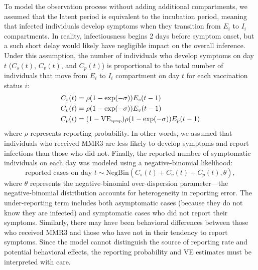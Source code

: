 \documentclass[12pt]{article}
\begin{document}
To model the observation process without adding additional compartments, we assumed that the latent period is equivalent to the incubation period, meaning that infected individuals develop symptoms when they transition from $E_i$ to $I_i$ compartments.
In reality, infectiousness begins 2 days before symptom onset, but a such short delay would likely have negligible impact on the overall inference.
Under this assumption, the number of individuals who develop symptoms on day $t$ ($C_s(t)$, $C_v(t)$, and $C_p(t)$) is proportional to the total number of individuals that move from $E_i$ to $I_i$ compartment on day $t$ for each vaccination status $i$:
\begin{align}
C_s(t) &= \rho (1-\exp(- \sigma)) E_s(t-1)\\
C_v(t) &= \rho (1-\exp(- \sigma)) E_v(t-1)\\
C_p(t) &= (1- \mathrm{VE}_{\textrm{\tiny{symp}}}) \rho (1-\exp(- \sigma)) E_p(t-1)
\end{align}
where $\rho$ represents reporting probability.
In other words, we assumed that individuals who received MMR3 are less likely to develop symptoms and report infections than those who did not.
Finally, the reported number of symptomatic individuals on each day was modeled using a negative-binomial likelihood:
\begin{equation}
\textrm{reported cases on day } t \sim \mathrm{NegBin}(C_s(t) + C_v(t) + C_p(t), \theta),
\end{equation}
where $\theta$ represents the negative-binomial over-dispersion parameter---the negative-binomial distribution accounts for heterogeneity in reporting error.
The under-reporting term includes both asymptomatic cases (because they do not know they are infected) and symptomatic cases who did not report their symptoms.
Similarly, there may have been behavioral differences between those who received MMR3 and those who have not in their tendency to report symptoms.
Since the model cannot distinguish the source of reporting rate and potential behavioral effects, the reporting probability and VE estimates must be interpreted with care.
\end{document}

